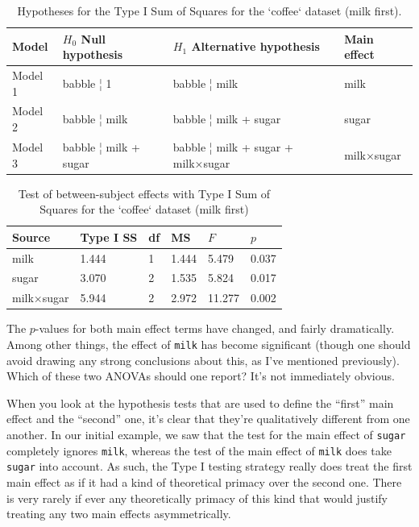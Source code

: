 \documentclass[
]{book}
\theoremstyle{definition}
\theoremstyle{definition}
\theoremstyle{definition}
\theoremstyle{definition}
\theoremstyle{remark}
\begin{document}
\begin{table}[!h]

\caption{\label{tab:unnamed-chunk-91}Hypotheses for the Type I Sum of Squares for the `coffee` dataset (milk first).}
\centering
\begin{tabular}[t]{llll}
\toprule
Model & $H_0$ Null hypothesis & $H_1$ Alternative hypothesis & Main effect\\
\midrule
Model 1 & babble ¦ 1 & babble ¦ milk & milk\\
Model 2 & babble ¦ milk & babble ¦ milk + sugar & sugar\\
Model 3 & babble ¦ milk + sugar & babble ¦ milk + sugar + milk×sugar & milk×sugar\\
\bottomrule
\end{tabular}
\end{table}

\begin{table}[!h]

\caption{\label{tab:unnamed-chunk-92}Test of between-subject effects with Type I Sum of Squares for the `coffee` dataset (milk first)}
\centering
\begin{tabular}[t]{llllll}
\toprule
Source & Type I SS & df & MS & $F$ & $p$\\
\midrule
milk & 1.444 & 1 & 1.444 & 5.479 & 0.037\\
sugar & 3.070 & 2 & 1.535 & 5.824 & 0.017\\
milk×sugar & 5.944 & 2 & 2.972 & 11.277 & 0.002\\
\bottomrule
\end{tabular}
\end{table}

The \(p\)-values for both main effect terms have changed, and fairly dramatically. Among other things, the effect of \texttt{milk} has become significant (though one should avoid drawing any strong conclusions about this, as I've mentioned previously). Which of these two ANOVAs should one report? It's not immediately obvious.

When you look at the hypothesis tests that are used to define the ``first'' main effect and the ``second'' one, it's clear that they're qualitatively different from one another. In our initial example, we saw that the test for the main effect of \texttt{sugar} completely ignores \texttt{milk}, whereas the test of the main effect of \texttt{milk} does take \texttt{sugar} into account. As such, the Type I testing strategy really does treat the first main effect as if it had a kind of theoretical primacy over the second one. There is very rarely if ever any theoretically primacy of this kind that would justify treating any two main effects asymmetrically.
\end{document}
